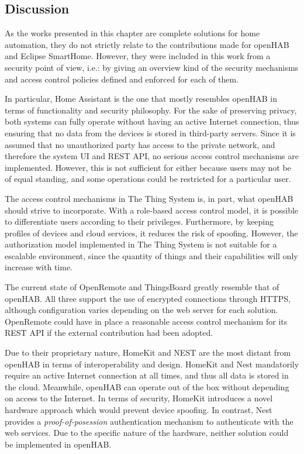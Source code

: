 \documentclass[12pt]{article}
\begin{document}
\subsection{Discussion}

As the works presented in this chapter are complete solutions for home automation, they do not strictly relate to the contributions made for openHAB and Eclipse SmartHome. However, they were included in this work from a security point of view, i.e.: by giving an overview kind of the security mechanisms and access control policies defined and enforced for each of them.

In particular, Home Assistant is the one that mostly resembles openHAB in terms of functionality and security philosophy. For the sake of preserving privacy, both systems can fully operate without having an active Internet connection, thus ensuring that no data from the devices is stored in third-party servers. Since it is assumed that no unauthorized party has access to the private network, and therefore the system UI and REST API, no serious access control mechanisms are implemented. However, this is not sufficient for either because users may not be of equal standing, and some operations could be restricted for a particular user.

The access control mechanisms in The Thing System is, in part, what openHAB should strive to incorporate. With a role-based access control model, it is possible to differentiate users according to their privileges. Furthermore, by keeping profiles of devices and cloud services, it reduces the risk of spoofing. However, the authorization model implemented in The Thing System is not suitable for a escalable environment, since the quantity of things and their capabilities will only increase with time.

The current state of OpenRemote and ThingsBoard greatly resemble that of openHAB. All three support the use of encrypted connections through HTTPS, although configuration varies depending on the web server for each solution. OpenRemote could have in place a reasonable access control mechanism for its REST API if the external contribution had been adopted.

Due to their proprietary nature, HomeKit and NEST are the most distant from openHAB in terms of interoperability and design. HomeKit and Nest mandatorily require an active Internet connection at all times, and thus all data is stored in the cloud. Meanwhile, openHAB can operate out of the box without depending on access to the Internet. In terms of security, HomeKit introduces a novel hardware approach which would prevent device spoofing. In contrast, Nest provides a \emph{proof-of-posession} authentication mechanism to authenticate with the web services. Due to the specific nature of the hardware, neither solution could be implemented in openHAB.
\end{document}
